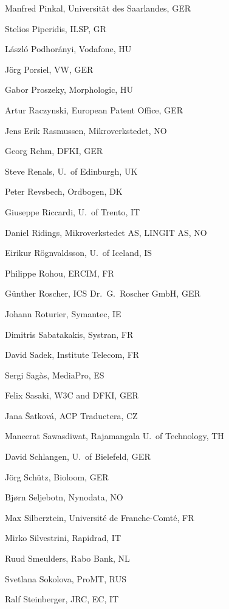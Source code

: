 \documentclass[10pt, plain]{../../metanetpaper}
\begin{document}
\begin{multicols}{3}
\begin{footnotesize}
\begin{enumerate}
{      \item Manfred Pinkal, Universität des Saarlandes, GER
      \item Stelios Piperidis, ILSP, GR
      \item László Podhorányi, Vodafone, HU
      \item Jörg Porsiel, VW, GER
      \item Gabor Proszeky, Morphologic, HU
      \item Artur Raczynski, European Patent Office, GER
      \item Jens Erik Rasmussen, Mikroverkstedet, NO
      \item Georg Rehm, DFKI, GER
      \item Steve Renals, U.~of Edinburgh, UK
      \item Peter Revsbech, Ordbogen, DK
      \item Giuseppe Riccardi, U.~of Trento, IT
      \item Daniel Ridings, Mikroverkstedet AS, LINGIT AS, NO
      \item Eirikur Rögnvaldsson, U.~of Iceland, IS
      \item Philippe Rohou, ERCIM, FR
      \item Günther Roscher, ICS Dr.~G.~Roscher GmbH, GER
      \item Johann Roturier, Symantec, IE
      \item Dimitris Sabatakakis, Systran, FR
      \item David Sadek, Institute Telecom, FR
      \item Sergi Sagàs, MediaPro, ES
      \item Felix Sasaki, W3C and DFKI, GER
      \item Jana Šatková, ACP Traductera, CZ
      \item Maneerat Sawasdiwat, Rajamangala U.~of Technology, TH
      \item David Schlangen, U.~of Bielefeld, GER
      \item Jörg Schütz, Bioloom, GER
      \item Bjørn Seljebotn, Nynodata, NO
      \item Max Silberztein, Université de Franche-Comté, FR
      \item Mirko Silvestrini, Rapidrad, IT
      \item Ruud Smeulders, Rabo Bank, NL
      \item Svetlana Sokolova, ProMT, RUS
      \item Ralf Steinberger, JRC, EC, IT
}
\end{enumerate}
\end{footnotesize}
\end{multicols}
\end{document}
